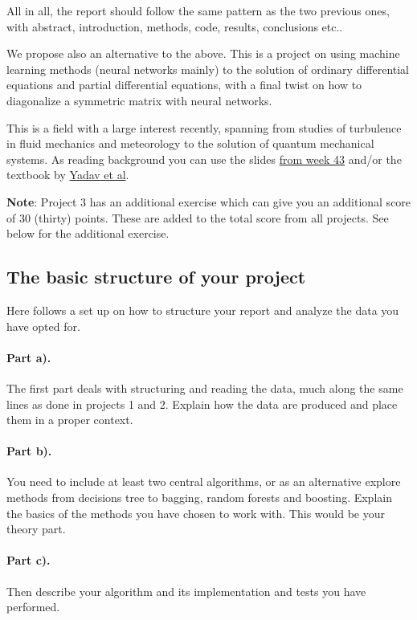 \documentclass[%
oneside,                 %
final,                   %
10pt]{article}
\begin{document}
\noindent
All in all, the report should follow the same pattern as the two previous ones, with abstract, introduction, methods, code, results, conclusions etc..

We propose also an alternative to the above. This is a project on using machine learning methods (neural networks mainly) to the solution of ordinary differential equations and partial differential equations, with a final twist on how to diagonalize a symmetric matrix with neural networks.

This is a field with a large interest recently, spanning from studies of turbulence in fluid mechanics and meteorology to the solution of quantum mechanical systems. As reading background you can use the slides \href{{https://compphysics.github.io/MachineLearning/doc/pub/week42/html/week42.html}}{from week 43} and/or the textbook by \href{{https://www.springer.com/gp/book/9789401798150}}{Yadav et al}.

\textbf{Note}: Project 3 has an additional exercise which can give you an additional score of 30 (thirty) points. These are added to the total score from all projects. See below for the additional exercise. 

\subsection*{The basic structure of your project}

Here follows a set up on how to structure your report and analyze the data you have opted for.

\paragraph{Part a).}
The first part deals with structuring and reading the data, much along the same lines as done in projects 1 and 2.  Explain how the data are produced and place them in a proper context.

\paragraph{Part b).}
You need to include at least two central algorithms, or as an alternative explore methods from decisions tree to bagging, random forests and boosting. Explain the basics of the methods you have chosen to work with. This would be your theory part.

\paragraph{Part c).}
Then describe your algorithm and its implementation and tests you have performed.
\end{document}
